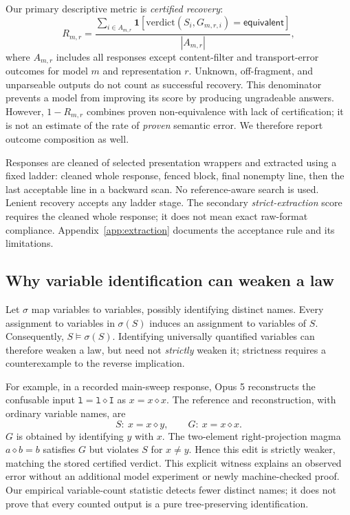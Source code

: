 \documentclass{article}
\newcommand{\op}{\mathbin{\diamond}}
\newcommand{\Eq}{\mathsf{equivalent}}
\begin{document}
Our primary descriptive metric is \emph{certified recovery}:
\begin{equation}
 R_{m,r}=\frac{\sum_{i\in A_{m,r}}\mathbf{1}[\mathrm{verdict}(S_i,G_{m,r,i})=\Eq]}
 {|A_{m,r}|},
 \label{eq:recovery}
\end{equation}
where $A_{m,r}$ includes all responses except content-filter and transport-error
outcomes for model $m$ and representation $r$. Unknown, off-fragment, and
unparseable outputs do not count as successful recovery. This denominator
prevents a model from improving its score by producing ungradeable answers.
However, $1-R_{m,r}$ combines proven non-equivalence with lack of certification;
it is not an estimate of the rate of \emph{proven} semantic error.
We therefore report outcome composition as well.

Responses are cleaned of selected presentation wrappers and extracted using a
fixed ladder: cleaned whole response, fenced block, final nonempty line, then
the last acceptable line in a backward scan. No reference-aware search is used.
Lenient recovery accepts any ladder stage. The secondary \emph{strict-extraction}
score requires the cleaned whole response; it does not mean exact raw-format
compliance. Appendix~\ref{app:extraction} documents the acceptance rule and its
limitations.

\subsection{Why variable identification can weaken a law}

Let $\sigma$ map variables to variables, possibly identifying distinct names.
Every assignment to variables in $\sigma(S)$ induces an assignment to variables
of $S$. Consequently, $S\models\sigma(S)$. Identifying universally quantified
variables can therefore weaken a law, but need not \emph{strictly} weaken it;
strictness requires a counterexample to the reverse implication.

For example, in a recorded main-sweep response, Opus 5 reconstructs the
confusable input $\mathtt{l}=\mathtt{l}\op\mathtt{I}$ as $x=x\op x$.
The reference and reconstruction, with ordinary variable names, are
\begin{equation}
 S:\ x=x\op y,
 \qquad G:\ x=x\op x.
 \label{eq:merge}
\end{equation}
$G$ is obtained by identifying $y$ with $x$. The two-element right-projection
magma $a\op b=b$ satisfies $G$ but violates $S$ for $x\ne y$.
Hence this edit is strictly weaker, matching the stored certified verdict.
This explicit witness explains an observed error without an additional model
experiment or newly machine-checked proof. Our empirical
variable-count statistic detects fewer distinct names; it does not prove that
every counted output is a pure tree-preserving identification.
\end{document}
